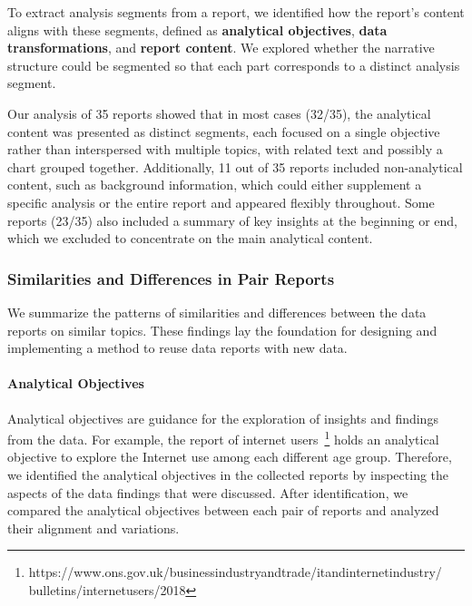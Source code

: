 To extract analysis segments from a report, we identified how the report's content aligns with these segments, defined as \textbf{analytical objectives}, \textbf{data transformations}, and \textbf{report content}. 
We explored whether the narrative structure could be segmented so that each part corresponds to a distinct analysis segment.

Our analysis of 35 reports showed that in most cases (32/35), the analytical content was presented as distinct segments, each focused on a single objective rather than interspersed with multiple topics, with related text and possibly a chart grouped together.
Additionally, 11 out of 35 reports included non-analytical content, such as background information, which could either supplement a specific analysis or the entire report and appeared flexibly throughout. 
Some reports (23/35) also included a summary of key insights at the beginning or end, which we excluded to concentrate on the main analytical content.

\subsubsection{Similarities and Differences in Pair Reports}

We summarize the patterns of similarities and differences between the data reports on similar topics. 
These findings lay the foundation for designing and implementing a method to reuse data reports with new data. 

\paragraph{Analytical Objectives}
Analytical objectives are guidance for the exploration of insights and findings from the data.
For example, the report of internet users~\footnote{https://www.ons.gov.uk/businessindustryandtrade/itandinternetindustry/\\bulletins/internetusers/2018} holds an analytical objective to explore the Internet use among each different age group. 
Therefore, we identified the analytical objectives in the collected reports by inspecting the aspects of the data findings that were discussed. 
After identification, we compared the analytical objectives between each pair of reports and analyzed their alignment and variations. 

